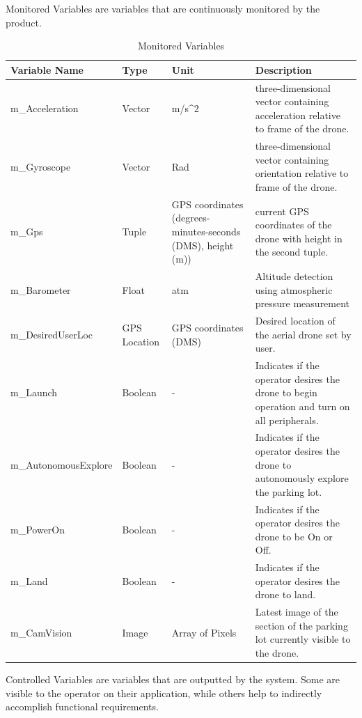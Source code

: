 \documentclass{article}
\begin{document}
\newpage
Monitored Variables are variables that are continuously monitored by the product.
\begin{table}[!h]
\begin{center}
\caption {Monitored Variables} \label{tab:title}
\begin{tabular}{ | m{3cm} | m{2cm} | m{2cm} | m{6cm} | } 
\hline
 Variable Name & Type & Unit & Description \\ 
 \hline
m\_Acceleration	& Vector& m/s^2 & three-dimensional vector containing acceleration relative to frame of the drone. \\
\hline
m\_Gyroscope & Vector	&Rad &	 three-dimensional vector containing orientation relative to frame of the drone.\\
\hline
m\_Gps	& Tuple &	 GPS coordinates (degrees-minutes-seconds (DMS), height (m))&	 current GPS coordinates of the drone with height in the second tuple.\\
\hline
m\_Barometer	& Float&	atm	 &Altitude detection using atmospheric pressure measurement\\
\hline
m\_DesiredUserLoc &	GPS Location&	 GPS coordinates (DMS) &	 Desired location of the aerial drone set by user.\\
\hline
m\_Launch &	Boolean	 &  - &	Indicates if the operator desires the drone to begin operation and turn on all peripherals.  \\
\hline
m\_AutonomousExplore &	Boolean &	 -	 &Indicates if the operator desires the drone to autonomously explore the parking lot.\\ 
\hline
m\_PowerOn&	Boolean  &	- &	Indicates if the operator desires the drone to be On or Off.\\
\hline
m\_Land&Boolean&	-&	Indicates if the operator desires the drone to land.\\
\hline
 m\_CamVision &	Image&	Array of Pixels&	Latest image of the section of the parking lot currently visible to the drone.\\
\hline

\end{tabular}
\end{center}
\end{table}

\newpage

Controlled Variables are variables that are outputted by the system. Some are visible to the operator on their application, while others help to indirectly accomplish functional requirements. 
\end{document}
